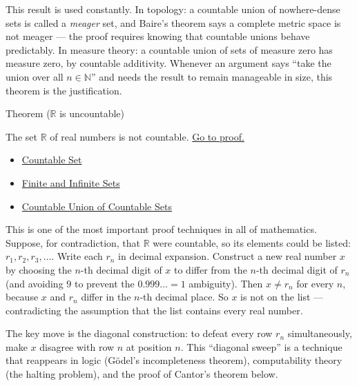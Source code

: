 \begin{remark*}
This result is used constantly. In topology: a countable union of nowhere-dense
sets is called a \emph{meager} set, and Baire's theorem says a complete metric
space is not meager — the proof requires knowing that countable unions behave
predictably. In measure theory: a countable union of sets of measure zero has
measure zero, by countable additivity. Whenever an argument says ``take the
union over all $n \in \mathbb{N}$'' and needs the result to remain manageable
in size, this theorem is the justification.
\end{remark*}


\begin{theorembox}{Theorem ($\mathbb{R}$ is uncountable)}
\begin{theorem}\label{thm:R-uncountable}
The set $\mathbb{R}$ of real numbers is not countable.
\hyperref[prf:r-uncountable]{Go to proof.}
\end{theorem}
\end{theorembox}

\begin{dependencies}
\begin{itemize}
  \item \hyperref[def:countable]{Countable Set}
  \item \hyperref[def:finite-infinite]{Finite and Infinite Sets}
  \item \hyperref[thm:countable-union]{Countable Union of Countable Sets}
\end{itemize}
\end{dependencies}

\begin{remark*}
This is one of the most important proof techniques in all of mathematics.
Suppose, for contradiction, that $\mathbb{R}$ were countable, so its elements
could be listed: $r_1, r_2, r_3, \dots$. Write each $r_n$ in decimal
expansion. Construct a new real number $x$ by choosing the $n$-th decimal
digit of $x$ to differ from the $n$-th decimal digit of $r_n$ (and avoiding
$9$ to prevent the $0.999\dots = 1$ ambiguity). Then $x \neq r_n$ for every
$n$, because $x$ and $r_n$ differ in the $n$-th decimal place. So $x$ is not
on the list — contradicting the assumption that the list contains every real
number.

The key move is the diagonal construction: to defeat every row $r_n$
simultaneously, make $x$ disagree with row $n$ at position $n$. This
``diagonal sweep'' is a technique that reappears in logic (Gödel's
incompleteness theorem), computability theory (the halting problem), and the
proof of Cantor's theorem below.
\end{remark*}


